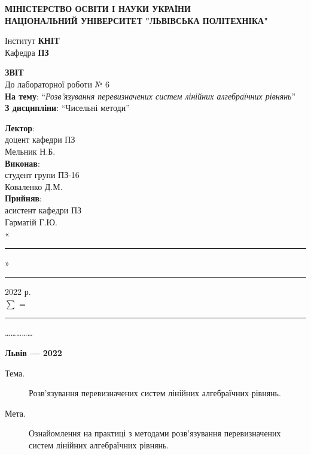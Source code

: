 \documentclass{article}
\newcommand\subject{Чисельні методи}
\newcommand\lecturer{доцент кафедри ПЗ\\Мельник Н.Б.}
\newcommand\teacher{асистент кафедри ПЗ\\Гарматій Г.Ю.}
\newcommand\mygroup{ПЗ-16}
\newcommand\lab{6}
\newcommand\theme{Розв'язування перевизначених систем лінійних алгебраїчних рівнянь}
\newcommand\purpose{Ознайомлення на практиці з методами розв’язування
	перевизначених систем лінійних алгебраїчних рівнянь}
\begin{document}
	\begin{large}
		\begin{titlepage}
			\thispagestyle{empty}
			\begin{center}
				\textbf{МІНІСТЕРСТВО ОСВІТИ І НАУКИ УКРАЇНИ\\
					НАЦІОНАЛЬНИЙ УНІВЕРСИТЕТ "ЛЬВІВСЬКА ПОЛІТЕХНІКА"}
			\end{center}
			\begin{flushright}
				Інститут \textbf{КНІТ}\\
				Кафедра \textbf{ПЗ}
			\end{flushright}
			\vspace{200pt}
			\begin{center}
				\textbf{ЗВІТ}\\
				\vspace{10pt}
				До лабораторної роботи № \lab\\
				\textbf{На тему}: “\textit{\theme}”\\
				\textbf{З дисципліни}: “\subject”
			\end{center}
			\vspace{90pt}
			\begin{flushright}
				
				\textbf{Лектор}:\\
				\lecturer\\
				\vspace{28pt}
				\textbf{Виконав}:\\
				
				студент групи \mygroup\\
				Коваленко Д.М.\\
				\vspace{28pt}
				\textbf{Прийняв}:\\
				
				\teacher\\
				
				\vspace{28pt}
				«\rule{1cm}{0.15mm}» \rule{1.5cm}{0.15mm} 2022 р.\\
				$\sum$ = \rule{1cm}{0.15mm}……………\\
				
			\end{flushright}
			\vspace{\fill}
			\begin{center}
				\textbf{Львів — 2022}
			\end{center}
		\end{titlepage}
		
		\begin{description}
			\item[Тема.] \theme.
			\item[Мета.] \purpose.
		\end{description}
		

\end{large}
\end{document}
